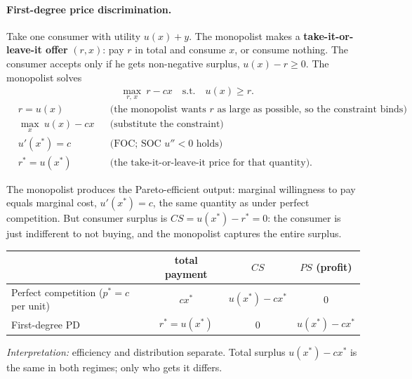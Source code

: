 \paragraph{First-degree price discrimination.} Take one consumer with utility $u(x)+y$. The monopolist makes a \textbf{take-it-or-leave-it offer} $(r,x)$: pay $r$ in total and consume $x$, or consume nothing. The consumer accepts only if he gets non-negative surplus, $u(x)-r\ge 0$. The monopolist solves
\begin{align*}
&\max_{r,\,x}\ r-cx\quad\text{s.t.}\quad u(x)\ge r .
\end{align*}
\begin{align*}
&r=u(x) &&\text{(the monopolist wants $r$ as large as possible, so the constraint binds)}\\
&\max_x\ u(x)-cx &&\text{(substitute the constraint)}\\
&u'(x^*)=c &&\text{(FOC; SOC $u''<0$ holds)}\\
&r^*=u(x^*) &&\text{(the take-it-or-leave-it price for that quantity).}
\end{align*}

\begin{keybox}[title=First-degree price discrimination]
The monopolist produces the Pareto-efficient output: marginal willingness to pay equals marginal cost, $u'(x^*)=c$, the same quantity as under perfect competition. But consumer surplus is $CS=u(x^*)-r^*=0$: the consumer is just indifferent to not buying, and the monopolist captures the entire surplus.
\begin{center}\small
\begin{tabular}{lccc}
 & total payment & $CS$ & $PS$ (profit)\\\hline
Perfect competition ($p^*=c$ per unit) & $cx^*$ & $u(x^*)-cx^*$ & $0$\\
First-degree PD & $r^*=u(x^*)$ & $0$ & $u(x^*)-cx^*$
\end{tabular}
\end{center}
\end{keybox}
\emph{Interpretation:} efficiency and distribution separate. Total surplus $u(x^*)-cx^*$ is the same in both regimes; only who gets it differs.

